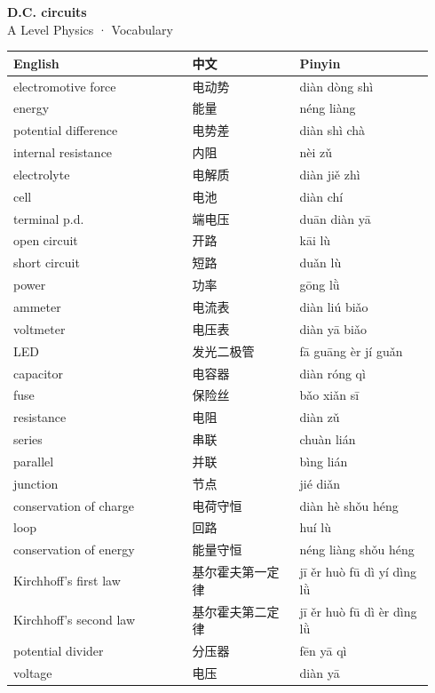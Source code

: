\documentclass[11pt]{article}
\begin{document}
\begin{center}
  {\LARGE\bfseries D.C. circuits}\\[0.35em]
  {\large A Level Physics · Vocabulary}
\end{center}
\vspace{0.6em}

\begin{longtable}{@{}p{0.40\linewidth}p{0.24\linewidth}p{0.30\linewidth}@{}}
\toprule
\textbf{English} & \textbf{中文} & \textbf{Pinyin} \\
\midrule
\endhead
\bottomrule
\endlastfoot
electromotive force & 电动势 & diàn dòng shì \\
energy & 能量 & néng liàng \\
potential difference & 电势差 & diàn shì chà \\
internal resistance & 内阻 & nèi zǔ \\
electrolyte & 电解质 & diàn jiě zhì \\
cell & 电池 & diàn chí \\
terminal p.d. & 端电压 & duān diàn yā \\
open circuit & 开路 & kāi lù \\
short circuit & 短路 & duǎn lù \\
power & 功率 & gōng lǜ \\
ammeter & 电流表 & diàn liú biǎo \\
voltmeter & 电压表 & diàn yā biǎo \\
LED & 发光二极管 & fā guāng èr jí guǎn \\
capacitor & 电容器 & diàn róng qì \\
fuse & 保险丝 & bǎo xiǎn sī \\
resistance & 电阻 & diàn zǔ \\
series & 串联 & chuàn lián \\
parallel & 并联 & bìng lián \\
junction & 节点 & jié diǎn \\
conservation of charge & 电荷守恒 & diàn hè shǒu héng \\
loop & 回路 & huí lù \\
conservation of energy & 能量守恒 & néng liàng shǒu héng \\
Kirchhoff's first law & 基尔霍夫第一定律 & jī ěr huò fū dì yí dìng lǜ \\
Kirchhoff's second law & 基尔霍夫第二定律 & jī ěr huò fū dì èr dìng lǜ \\
potential divider & 分压器 & fēn yā qì \\
voltage & 电压 & diàn yā \\

\end{longtable}
\end{document}
